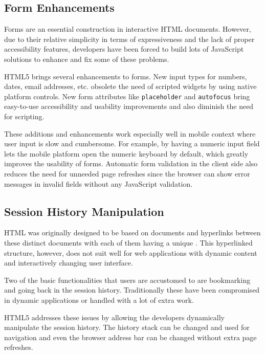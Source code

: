 \subsection{Form Enhancements}

Forms are an essential construction in interactive HTML
documents. However, due to their relative simplicity in terms of
expressiveness and the lack of proper accessibility features,
developers have been forced to build lots of JavaScript solutions to
enhance and fix some of these problems.

HTML5 brings several enhancements to forms. New input types for
numbers, dates, email addresses, etc. obsolete the need of scripted
widgets by using native platform controls. New form attributes like
\texttt{placeholder} and \texttt{autofocus} bring easy-to-use
accessibility and usability improvements and also diminish the need
for scripting. \cite{HTML5draft}

These additions and enhancements work especially well in mobile
context where user input is slow and cumbersome. For example, by
having a numeric input field lets the mobile platform open the numeric
keyboard by default, which greatly improves the usability of
forms. Automatic form validation in the client side also reduces the
need for unneeded page refreshes since the browser can show error
messages in invalid fields without any JavaScript validation.

\subsection{Session History Manipulation}

HTML was originally designed to be based on documents and hyperlinks
between these distinct documents with each of them having a unique
. This hyperlinked structure, however, does not suit well
for web applications with dynamic content and interactively changing
user interface.

Two of the basic functionalities that users are accustomed to are
bookmarking and going back in the session history. Traditionally these
have been compromised in dynamic  applications or handled
with a lot of extra work.

HTML5 addresses these issues by allowing the developers dynamically
manipulate the session history. The history stack can be changed and
used for navigation and even the browser address bar can be changed
without extra page refreshes. \cite{HTML5draft}

